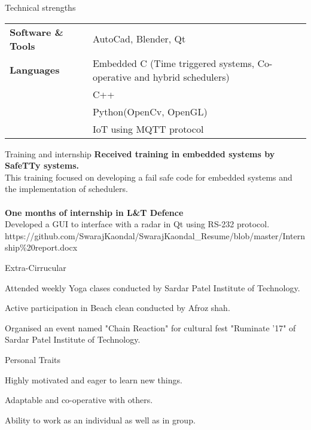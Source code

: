 \documentclass{resume} %
\begin{document}
\begin{rSection}{Technical strengths}
\begin{tabular}{ @{} >{\bfseries}l @{\hspace{6ex}} l }
Software \& Tools \ & AutoCad, Blender, Qt \\
Languages & Embedded C (Time triggered systems, Co-operative and hybrid schedulers)\\ & C++\\ & Python(OpenCv, OpenGL) \\ & IoT using MQTT protocol \\
\end{tabular}
\end{rSection}

\begin{rSection}{Training and internship}
{\bf Received training in embedded systems by SafeTTy systems.}
\\This training focused on developing a fail safe code for embedded systems and the implementation of schedulers.\\
\\{\bf One months of internship in L\&T Defence}
\\Developed a GUI to interface with a radar in Qt using RS-232 protocol.
\\https://github.com/SwarajKaondal/SwarajKaondal\_Resume/blob/master/Internship\%20report.docx
\end{rSection}

\newpage
\begin{rSection}{Extra-Cirrucular} \itemsep -3pt
\item Attended weekly Yoga clases conducted by Sardar Patel Institute of Technology.
\item Active participation in Beach clean conducted by Afroz shah.
\item Organised an event named "Chain Reaction" for cultural fest "Ruminate '17" of Sardar Patel Institute of Technology.
\end{rSection}

\begin{rSection}{Personal Traits}
\item Highly motivated and eager to learn new things.
\item Adaptable and co-operative with others.
\item Ability to work as an individual as well as in group.
\end{rSection}
\end{document}
